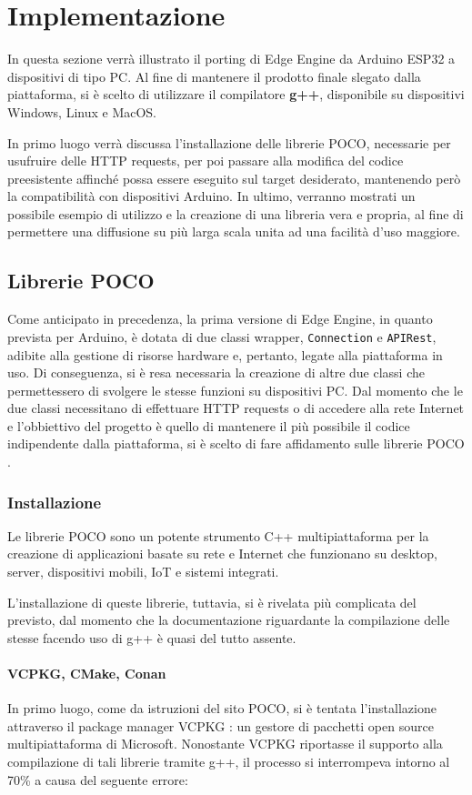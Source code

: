 \chapter{Implementazione}
In questa sezione verrà illustrato il porting di Edge Engine da Arduino ESP32 a dispositivi di tipo PC. Al fine di mantenere il prodotto finale slegato dalla piattaforma, si è scelto di utilizzare il compilatore \textbf{g++}, disponibile su dispositivi Windows, Linux e MacOS.

In primo luogo verrà discussa l’installazione delle librerie POCO, necessarie per usufruire delle HTTP requests, per poi passare alla modifica del codice preesistente affinché possa essere eseguito sul target desiderato, mantenendo però la compatibilità con dispositivi Arduino. In ultimo, verranno mostrati un possibile esempio di utilizzo e la creazione di una libreria vera e propria, al fine di permettere una diffusione su più larga scala unita ad una facilità d'uso maggiore.
\section{Librerie POCO}
Come anticipato in precedenza, la prima versione di Edge Engine, in quanto prevista per Arduino, è dotata di due classi wrapper, \texttt{Connection} e \texttt{APIRest}, adibite alla gestione di risorse hardware e, pertanto, legate alla piattaforma in uso. Di conseguenza, si è resa necessaria la creazione di altre due classi che permettessero di svolgere le stesse funzioni su dispositivi PC. Dal momento che le due classi necessitano di effettuare HTTP requests o di accedere alla rete Internet e l’obbiettivo del progetto è quello di mantenere il più possibile il codice indipendente dalla piattaforma, si è scelto di fare affidamento sulle librerie POCO \cite{POCO}.
\subsection{Installazione}
Le librerie POCO sono un potente strumento C++ multipiattaforma per la creazione di applicazioni basate su rete e Internet che funzionano su desktop, server, dispositivi mobili, IoT e sistemi integrati.

L’installazione di queste librerie, tuttavia, si è rivelata più complicata del previsto, dal momento che la documentazione riguardante la compilazione delle stesse facendo uso di g++ è quasi del tutto assente.

\subsubsection{VCPKG, CMake, Conan}
In primo luogo, come da istruzioni del sito POCO, si è tentata l’installazione attraverso il package manager VCPKG \cite{VCPKG}: un gestore di pacchetti open source multipiattaforma di Microsoft. Nonostante VCPKG riportasse il supporto alla compilazione di tali librerie tramite g++, il processo si interrompeva intorno al 70\% a causa del seguente errore:

